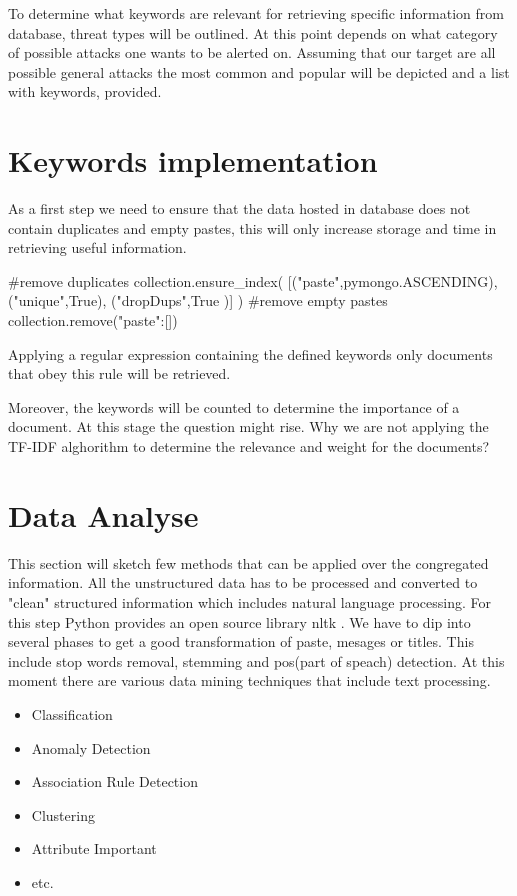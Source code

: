 \documentclass[12pt]{article}
\begin{document}
To determine what keywords are relevant for retrieving specific information from database, threat types will be outlined. At this point depends on what category of possible attacks one wants to be alerted on. Assuming that our target are all possible general attacks the most common and popular will be depicted and a list with keywords, provided.

\section{Keywords implementation}
As a first step we need to ensure that the data hosted in database does not contain duplicates and empty pastes, this will only increase storage and time in retrieving useful information.
\begin{spverbatim}
#remove duplicates
collection.ensure_index( [("paste",pymongo.ASCENDING),
 ("unique",True), ("dropDups",True )] )
#remove empty pastes
collection.remove({"paste":[]})
\end{spverbatim}
\hfill \break
Applying a regular expression containing the defined keywords only documents that obey this rule will be retrieved.
\begin{spverbatim}
\end{spverbatim}
Moreover, the keywords will be counted to determine the importance of a document. At this stage the question might rise. Why we are not applying the TF-IDF alghorithm to determine the relevance and weight for the documents?
\section{Data Analyse}
This section will sketch few methods that can be applied over the congregated information. All the unstructured data has to be processed and converted to "clean" structured information which includes natural language processing. For this step Python provides an open source library nltk \cite{nltk}. We have to dip into several phases to get a good transformation of  paste, mesages or titles. This include stop words removal, stemming and pos(part of speach) detection. 
At this moment there are various data mining techniques \cite{oracle-list} that include text processing. 
\begin{itemize}
\item Classification
\item Anomaly Detection
\item Association Rule Detection
\item Clustering
\item Attribute Important 
\item etc.
\end{itemize}
\end{document}
